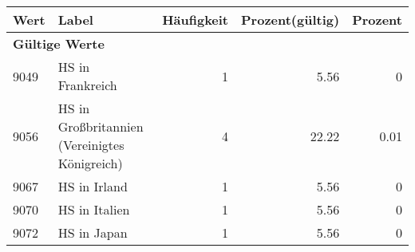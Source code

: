      \begin{longtable}{lXrrr}
     \toprule
     \textbf{Wert} & \textbf{Label} & \textbf{Häufigkeit} & \textbf{Prozent(gültig)} & \textbf{Prozent} \\
     \endhead
     \midrule
     \multicolumn{5}{l}{\textbf{Gültige Werte}}\\

     9049 &
     \multicolumn{1}{X}{ HS in Frankreich   } &


       \num{1} &
       \num[round-mode=places,round-precision=2]{5,56} &
         \num[round-mode=places,round-precision=2]{0} \\

     9056 &
     \multicolumn{1}{X}{ HS in Großbritannien (Vereinigtes Königreich)   } &


       \num{4} &
       \num[round-mode=places,round-precision=2]{22,22} &
         \num[round-mode=places,round-precision=2]{0,01} \\

     9067 &
     \multicolumn{1}{X}{ HS in Irland   } &


       \num{1} &
       \num[round-mode=places,round-precision=2]{5,56} &
         \num[round-mode=places,round-precision=2]{0} \\

     9070 &
     \multicolumn{1}{X}{ HS in Italien   } &


       \num{1} &
       \num[round-mode=places,round-precision=2]{5,56} &
         \num[round-mode=places,round-precision=2]{0} \\

     9072 &
     \multicolumn{1}{X}{ HS in Japan   } &


       \num{1} &
       \num[round-mode=places,round-precision=2]{5,56} &
         \num[round-mode=places,round-precision=2]{0} \\


\end{longtable}
